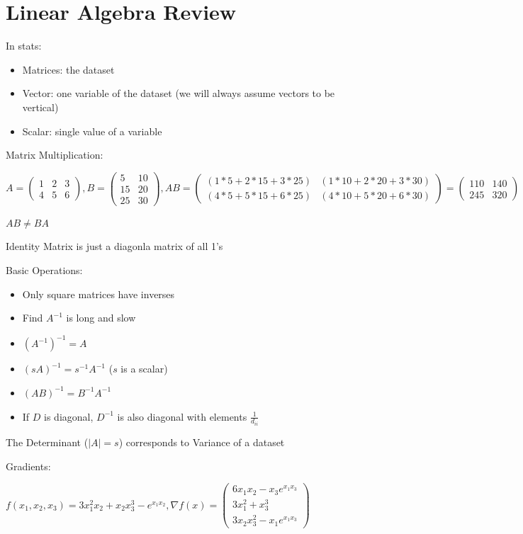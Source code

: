 \documentclass{article}
\begin{document}
\tableofcontents

\newpage

\section{Linear Algebra Review}

In stats: 

\begin{itemize}
    \item Matrices: the dataset
    \item Vector: one variable of the dataset (we will always assume vectors to be vertical)
    \item Scalar: single value of a variable
\end{itemize}

Matrix Multiplication:

$$
A = \begin{pmatrix} 1 & 2 & 3 \\ 4 & 5 & 6 \end{pmatrix}, 
B = \begin{pmatrix} 5 & 10 \\ 15 & 20 \\ 25 & 30 \end{pmatrix}, 
AB = \begin{pmatrix} (1*5 + 2*15 + 3*25) & (1*10+2*20+3*30) \\
    (4*5 + 5*15 + 6*25) & (4*10 + 5*20 + 6*30) 
\end{pmatrix} = 
\begin{pmatrix}
    110 & 140 \\ 245  & 320
\end{pmatrix}
$$

$AB \neq BA$

Identity Matrix is just a diagonla matrix of all 1's

Basic Operations:
\begin{itemize}
    \item Only square matrices have inverses
    \item Find $A^{-1}$ is long and slow
    \item $(A^{-1})^{-1} = A$
    \item $(sA)^{-1} = s^{-1}A^{-1}$ ($s$ is a scalar)
    \item $(AB)^{-1} = B^{-1}A^{-1}$
    \item If $D$ is diagonal, $D^{-1}$ is also diagonal with elements $\frac{1}{d_{ii}}$
\end{itemize}


The Determinant ($|A| = s$) corresponds to Variance of a dataset

Gradients:

$f(x_1, x_2, x_3) = 3x_1^2x_2 + x_2x_3^3 - e^{x_1x_2}, \nabla f(x) = 
\begin{pmatrix}
    6x_1x_2-x_3e^{x_1x_3} \\
    3x_1^2 + x_3^3 \\
    3x_2x_3^2 - x_1e^{x_1x_3}
\end{pmatrix}
$
\end{document}
